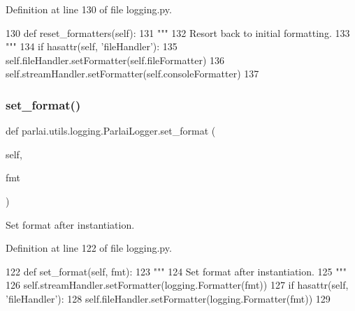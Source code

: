 Definition at line 130 of file logging.\+py.


\begin{DoxyCode}
130     \textcolor{keyword}{def }reset\_formatters(self):
131         \textcolor{stringliteral}{"""}
132 \textcolor{stringliteral}{        Resort back to initial formatting.}
133 \textcolor{stringliteral}{        """}
134         \textcolor{keywordflow}{if} hasattr(self, \textcolor{stringliteral}{'fileHandler'}):
135             self.fileHandler.setFormatter(self.fileFormatter)
136         self.streamHandler.setFormatter(self.consoleFormatter)
137 
\end{DoxyCode}
\mbox{\label{classparlai_1_1utils_1_1logging_1_1ParlaiLogger_a1066ef97668ebb94d3204ccac1bed8f6}} 
\subsubsection{\texorpdfstring{set\+\_\+format()}{set\_format()}}
{\footnotesize\ttfamily def parlai.\+utils.\+logging.\+Parlai\+Logger.\+set\+\_\+format (\begin{DoxyParamCaption}\item[{}]{self,  }\item[{}]{fmt }\end{DoxyParamCaption})}

\begin{DoxyVerb}Set format after instantiation.
\end{DoxyVerb}
 

Definition at line 122 of file logging.\+py.


\begin{DoxyCode}
122     \textcolor{keyword}{def }set\_format(self, fmt):
123         \textcolor{stringliteral}{"""}
124 \textcolor{stringliteral}{        Set format after instantiation.}
125 \textcolor{stringliteral}{        """}
126         self.streamHandler.setFormatter(logging.Formatter(fmt))
127         \textcolor{keywordflow}{if} hasattr(self, \textcolor{stringliteral}{'fileHandler'}):
128             self.fileHandler.setFormatter(logging.Formatter(fmt))
129 
\end{DoxyCode}
\mbox{\label{classparlai_1_1utils_1_1logging_1_1ParlaiLogger_ad9b882180fc5cc0b81351f50d7fcd252}} 
